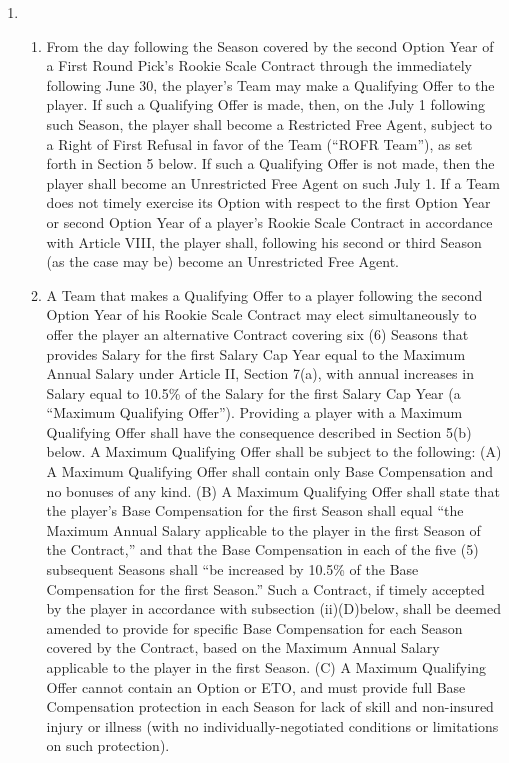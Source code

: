 \documentclass[
]{book}
\providecommand{\tightlist}{%
  \setlength{\itemsep}{0pt}\setlength{\parskip}{0pt}}
\begin{document}
\begin{enumerate}
\def\labelenumi{(\alph{enumi})}
\item
  \begin{enumerate}
  \def\labelenumii{(\roman{enumii})}
  \tightlist
  \item
    From the day following the Season covered by the second Option Year of a First Round Pick's Rookie Scale Contract through the immediately following June 30, the player's Team may make a Qualifying Offer to the player. If such a Qualifying Offer is made, then, on the July 1 following such Season, the player shall become a Restricted Free Agent, subject to a Right of First Refusal in favor of the Team (``ROFR Team''), as set forth in Section 5 below. If such a Qualifying Offer is not made, then the player shall become an Unrestricted Free Agent on such July 1. If a Team does not timely exercise its Option with respect to the first Option Year or second Option Year of a player's Rookie Scale Contract in accordance with Article VIII, the player shall, following his second or third Season (as the case may be) become an Unrestricted Free Agent.
  \item
    A Team that makes a Qualifying Offer to a player following the second Option Year of his Rookie Scale Contract may elect simultaneously to offer the player an alternative Contract covering six (6) Seasons that provides Salary for the first Salary Cap Year equal to the Maximum Annual Salary under Article II, Section 7(a), with annual increases in Salary equal to 10.5\% of the Salary for the first Salary Cap Year (a ``Maximum Qualifying Offer''). Providing a player with a Maximum Qualifying Offer shall have the consequence described in Section 5(b) below. A Maximum Qualifying Offer shall be subject to the following:
    (A) A Maximum Qualifying Offer shall contain only Base Compensation and no bonuses of any kind.
    (B) A Maximum Qualifying Offer shall state that the player's Base Compensation for the first Season shall equal ``the Maximum Annual Salary applicable to the player in the first Season of the Contract,'' and that the Base Compensation in each of the five (5) subsequent Seasons shall ``be increased by 10.5\% of the Base Compensation for the first Season.'' Such a Contract, if timely accepted by the player in accordance with subsection (ii)(D)below, shall be deemed amended to provide for specific Base Compensation for each Season covered by the Contract, based on the Maximum Annual Salary applicable to the player in the first Season.
    (C) A Maximum Qualifying Offer cannot contain an Option or ETO, and must provide full Base Compensation protection in each Season for lack of skill and non-insured injury or illness (with no individually-negotiated conditions or limitations on such protection).

\end{enumerate}
\end{enumerate}
\end{document}
